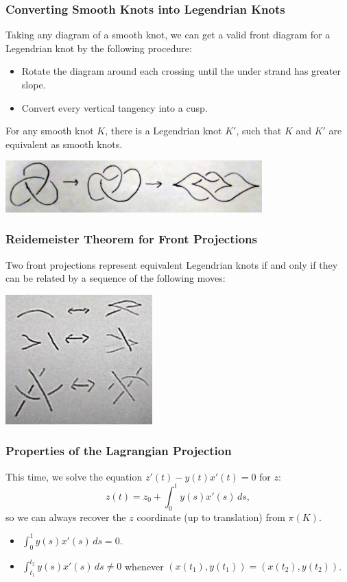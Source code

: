 \documentclass{beamer}
\begin{document}
\begin{frame}
    \frametitle{Converting Smooth Knots into Legendrian Knots}
    Taking any diagram of a smooth knot, we can get a valid front diagram for a Legendrian
    knot by the following procedure:
    \begin{itemize}
    \item Rotate the diagram around each crossing until the under strand has greater slope.
    \item Convert every vertical tangency into a cusp.
    \end{itemize}
    \begin{theorem}
        For any smooth knot $K$, there is a Legendrian knot $K'$, such that $K$ and $K'$ are
        equivalent as smooth knots.
    \end{theorem}
    \includegraphics[height=2cm]{smoothToLegendrian.jpg}
\end{frame}

\begin{frame}
    \frametitle{Reidemeister Theorem for Front Projections}
    \begin{theorem}
        Two front projections represent equivalent Legendrian knots if and only if
        they can be related by a sequence of the following moves:
    \end{theorem}
    \begin{center}
    \includegraphics[height=5cm]{Redemeister.jpg}
    \end{center}
\end{frame}

\begin{frame}
\frametitle{Properties of the Lagrangian Projection}
    This time, we solve the equation $z'(t) - y(t)x'(t) = 0$ for $z$:
    \[ z(t) = z_0 + \int_0^t y(s)x'(s)\,ds, \]
    so we can always recover the $z$ coordinate (up to translation) from $\pi(K)$.

    \begin{itemize}
    \item $\int_0^1 y(s)x'(s)\,ds = 0$.
    \item $\int_{t_1}^{t_2}y(s)x'(s)\,ds \neq 0$ whenever $(x(t_1),y(t_1))=(x(t_2),y(t_2))$.
    \end{itemize}
\end{frame}
\end{document}
